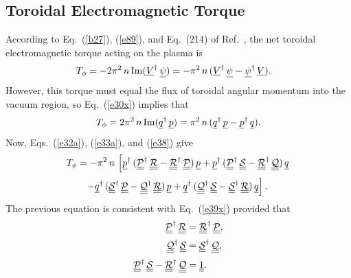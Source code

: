 \documentclass[12pt,prb,aps]{revtex4-1}
\begin{document}
\subsection{Toroidal Electromagnetic Torque}
According to Eq.~(\ref{b27}), (\ref{e89}), and Eq.~(214) of Ref.~, 
the net toroidal electromagnetic torque acting on the plasma  is
\begin{align}\label{e38}
T_\phi&= -2\pi^2\,n\,{\rm Im}(\underline{V}^\dag\,\underline{\psi})= -\pi^2\,n\,(\underline{V}^\dag\,\underline{\psi}-\underline{\psi}^\dag\,\underline{V}).
\end{align}
However, this torque must equal the flux of toroidal angular momentum into the vacuum region, so Eq.~(\ref{e30x}) implies that
\begin{equation}\label{e39x}
T_\phi= 2\pi^2\,n\,{\rm Im}(\underline{q}^\dag\,\underline{p})= \pi^2\,n\,(\underline{q}^\dag\,\underline{p}- \underline{p}^\dag\,\underline{q}).
\end{equation}
Now, Eqs.~(\ref{e32a}), (\ref{e33a}), and (\ref{e38}) give 
\begin{align}
T_\phi&= -\pi^2\,n\,\left[
\underline{p}^\dag\,(\underline{\underline{\cal P}}^\dag\,\underline{\underline{\cal R}}
- \underline{\underline{\cal R}}^\dag\,\underline{\underline{\cal P}})\,\underline{p}
+\underline{p}^\dag\,(\underline{\underline{\cal P}}^\dag\,\underline{\underline{\cal S}}
-\underline{\underline{\cal R}}^\dag\,\underline{\underline{\cal Q}})\,\underline{q}\right.\nonumber\\[0.5ex]
&\phantom{=}\left.- \underline{q}^\dag\,(\underline{\underline{\cal S}}^\dag\,\underline{\underline{\cal P}}
- \underline{\underline{\cal Q}}^\dag\,\underline{\underline{\cal R}})\,\underline{p}
+\underline{q}^\dag\,(\underline{\underline{\cal Q}}^\dag\,\underline{\underline{\cal S}}
- \underline{\underline{\cal S}}^\dag\,\underline{\underline{\cal R}})\,\underline{q}
\right].
\end{align}
The previous equation is consistent with Eq.~(\ref{e39x}) provided that
\begin{align}\label{e41x}
\underline{\underline{\cal P}}^\dag\,\underline{\underline{\cal R}}&= \underline{\underline{\cal R}}^\dag\,\underline{\underline{\cal P}},\\[0.5ex]
\underline{\underline{\cal Q}}^\dag\,\underline{\underline{\cal S}}&= \underline{\underline{\cal S}}^\dag\,\underline{\underline{\cal Q}},\label{e42x}\\[0.5ex]
\underline{\underline{\cal P}}^\dag\,\underline{\underline{\cal S}}- \underline{\underline{\cal R}}^\dag\,\underline{\underline{\cal Q}}&=\underline{\underline{1}}.\label{e43}
\end{align}
\end{document}
